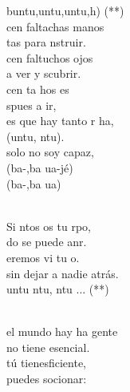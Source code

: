 \documentclass[12pt]{article}
\begin{document}
\begin{multicols*}{2}
\begin{cancion}%
	buntu,untu,untu,h) (**)\\
	cen faltachas manos \\
	tas para nstruir.\\
	cen faltuchos ojos \\
	a ver y scubrir.\\
	cen ta hos es \\
	spues a ir,\\
	es que hay tanto r ha,\\
	(untu, ntu).\\
	solo no soy capaz,\\
	(ba-,ba ua-jé)\\
	(ba-,ba ua)\\\jump\\
	\begin{chorus}%
	Si ntos os tu rpo,\\
	do se puede anr.\\
	eremos vi tu o. \\
sin dejar a nadie atrás.\\
	untu ntu, ntu ... (**)\\
	\end{chorus}%
	\jump\\
	 el mundo hay ha gente \\
	 no tiene  esencial.\\
	 tú tienesficiente, \\
	puedes socionar:\\

\end{cancion}
\end{multicols*}
\end{document}
